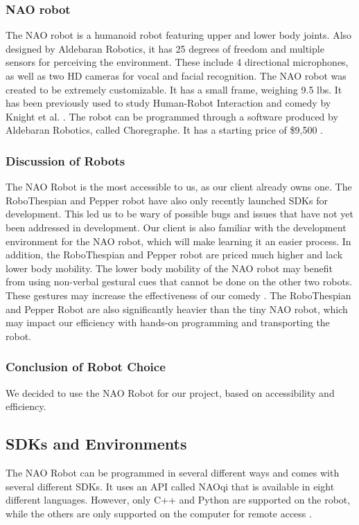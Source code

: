 \subsubsection{NAO robot}
The NAO robot is a humanoid robot featuring upper and lower body joints.
Also designed by Aldebaran Robotics, it has 25 degrees of freedom and multiple sensors for perceiving the environment.
These include 4 directional microphones, as well as two HD cameras for vocal and facial recognition.
The NAO robot was created to be extremely customizable.
It has a small frame, weighing 9.5 lbs.
It has been previously used to study Human-Robot Interaction and comedy by Knight et al. \cite{KnightSavvy:2011}.
The robot can be programmed through a software produced by Aldebaran Robotics, called Choregraphe.
It has a starting price of \$9,500 \cite{BuyNAO}. \cite{NAORobot}

\subsubsection{Discussion of Robots}
The NAO Robot is the most accessible to us, as our client already owns one.
The RoboThespian and Pepper robot have also only recently launched SDKs for development.
This led us to be wary of possible bugs and issues that have not yet been addressed in development.
Our client is also familiar with the development environment for the NAO robot, which will make learning it an easier process.
In addition, the RoboThespian and Pepper robot are priced much higher and lack lower body mobility.
The lower body mobility of the NAO robot may benefit from using non-verbal gestural cues that cannot be done on the other two robots.
These gestures may increase the effectiveness of our comedy \cite{KnightEightLessons:2011}.
The RoboThespian and Pepper Robot are also significantly heavier than the tiny NAO robot, which may impact our efficiency with hands-on programming and transporting the robot.

\subsubsection{Conclusion of Robot Choice}
We decided to use the NAO Robot for our project, based on accessibility and efficiency.

\subsection{SDKs and Environments}
The NAO Robot can be programmed in several different ways and comes with several different SDKs. It uses an API called NAOqi that is available in eight different languages. However, only C++ and Python are supported on the robot, while the others are only supported on the computer for remote access \cite{NAOSDK:Overview}.

